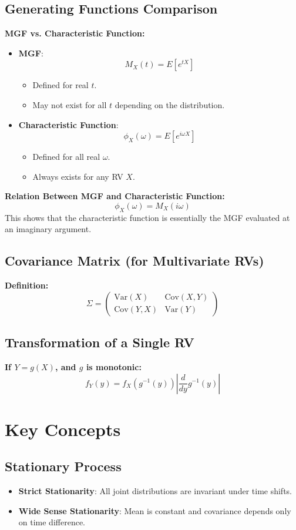 \documentclass[12pt]{article}
\begin{document}
\subsection{Generating Functions Comparison}
\textbf{MGF vs. Characteristic Function:}
\begin{itemize}
    \item \textbf{MGF}:
    \[
    M_X(t) = E[e^{tX}]
    \]
    \begin{itemize}
        \item Defined for real \( t \).
        \item May not exist for all \( t \) depending on the distribution.
    \end{itemize}
    \item \textbf{Characteristic Function}:
    \[
    \phi_X(\omega) = E[e^{i\omega X}]
    \]
    \begin{itemize}
        \item Defined for all real \( \omega \).
        \item Always exists for any RV \( X \).
    \end{itemize}
\end{itemize}

\textbf{Relation Between MGF and Characteristic Function:}
\[
\phi_X(\omega) = M_X(i\omega)
\]
This shows that the characteristic function is essentially the MGF evaluated at an imaginary argument.

\subsection{Covariance Matrix (for Multivariate RVs)}
\textbf{Definition:}
\[
\Sigma = 
\begin{pmatrix}
\text{Var}(X) & \text{Cov}(X,Y) \\
\text{Cov}(Y,X) & \text{Var}(Y)
\end{pmatrix}
\]

\subsection{Transformation of a Single RV}
\textbf{If \( Y = g(X) \), and \( g \) is monotonic:}
\[
f_Y(y) = f_X(g^{-1}(y)) \left| \frac{d}{dy} g^{-1}(y) \right|
\]

\section{Key Concepts}
\subsection{Stationary Process}
\begin{itemize}
    \item \textbf{Strict Stationarity}: All joint distributions are invariant under time shifts.
    \item \textbf{Wide Sense Stationarity}: Mean is constant and covariance depends only on time difference.
\end{itemize}
\end{document}
